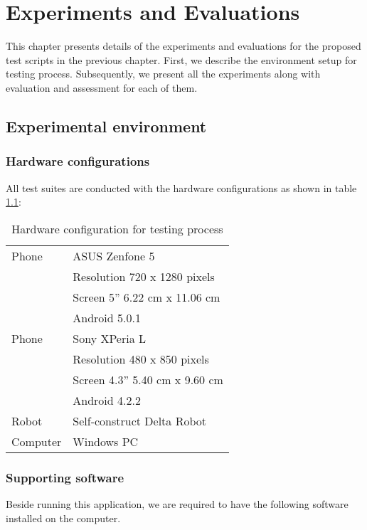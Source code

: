 \chapter{Experiments and Evaluations}
\label{ch:experiments}

This chapter presents details of the experiments and evaluations for the proposed test scripts in the previous chapter.
First, we describe the environment setup for testing process.
Subsequently, we present all the experiments along with evaluation and assessment for each of them.

\section{Experimental environment}

\subsection{Hardware configurations}
All test suites are conducted with the hardware configurations as shown in table \ref{tab:hw}:

\begin{table}[H]
	\centering
	\caption{Hardware configuration for testing process}	
	\label{tab:hw}
	\begin{tabularx}{0.65\textwidth}{ll}
		\toprule
		Phone & ASUS Zenfone 5 \\
			  & Resolution 720 x 1280 pixels \\
			  & Screen 5'' 6.22 cm x 11.06 cm \\
			  & Android 5.0.1\\
		\midrule 
		Phone & Sony XPeria L \\
			  & Resolution 480 x 850 pixels \\
			  & Screen 4.3'' 5.40 cm x 9.60 cm \\
			  & Android 4.2.2\\
		\midrule 
		Robot & Self-construct Delta Robot \\
		\midrule 
		Computer & Windows PC \\
		\bottomrule
	\end{tabularx}
\end{table}

\subsection{Supporting software}
Beside running this application, we are required to have the following software installed on the computer.

